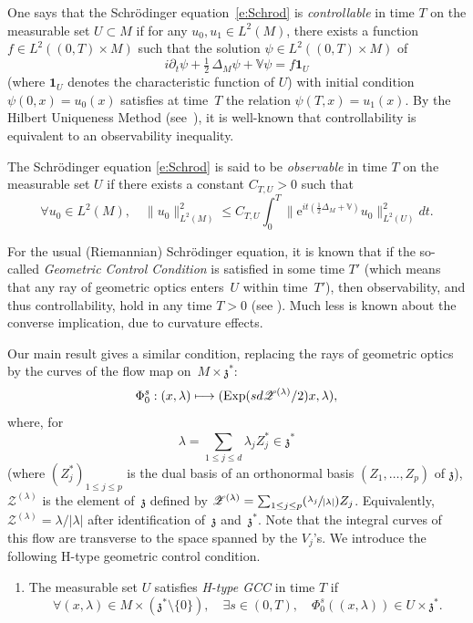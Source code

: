 \documentclass[10pt]{amsart}
\let\mathcal\mathscr
\newcommand\mto{\mathchoice{\longmapsto}{\mapsto}{\mapsto}{\mapsto}}
\newcommand{\Psfrac}[2]{(\sfrac{#1}{#2})}
\newcommand{\rme}{\mathrm{e}}
\newcommand{\bun}{\mathbf{1}}
\DeclareMathOperator{\Exp}{Exp}
\theoremstyle{plain}
\theoremstyle{definition}
\def\bbV{{\mathbb V}}
\begin{document}
One says that the Schrödinger equation~\eqref{e:Schrod} is \emph{controllable} in time $T$ on the measurable set $U\subset M$ if for any
$u_0,u_1\in L^2(M)$, there exists a function $f\in L^2((0,T)\times M)$ such that the solution $\psi\in L^2((0,T)\times M)$ of
\[
i\partial_t \psi+\tfrac 12\, \Delta_M \psi+\bbV\psi=f\bun_U
\]
(where $\bun_U$ denotes the characteristic function of $U$) with initial condition $\psi(0,x)=u_0(x)$ satisfies at time~$T$ the relation $\psi(T,x)=u_1(x).$
By the Hilbert Uniqueness Method (see~\cite{JLL}), it is well-known that controllability is equivalent to an observability inequality.

The Schrödinger equation \eqref{e:Schrod} is said to be \emph{observable} in time $T$ on the measurable set $U$ if there exists a constant $C_{T,U}>0$ such that
\begin{equation}\label{obs}
\forall u_0\in L^2(M),\quad \|u_0\|^2_{L^2(M)} \leq C_{T,U} \int_0^T \bigl\| \rme^{it(\frac12 \Delta_M+\bbV)} u_0\bigr\|^2_{L^2(U)} dt.
\end{equation}

For the usual (Riemannian) Schrödinger equation, it is known that if the so-called \emph{Geometric Control Condition} is satisfied in some time $T'$ (which means that any ray of geometric optics enters~$U$ within time~$T'$), then observability, and thus controllability, hold in any time $T>0$ (see \cite{Leb}). Much less is known about the converse implication, due to curvature effects.

Our main result
gives a similar condition, replacing the rays of geometric optics by the curves of the flow map on~$M\times \mathfrak z^*$:
\[
\Phi^s_0: (x,\lambda)\mto (\Exp (sd\mathcal Z^{(\lambda)}/2)x,\lambda),
\]
where, for
\[
\lambda= \sum_{1\leq j\leq d } \lambda_j Z_j^*\in\mathfrak z^*
\]
(where $(Z_j^*)_{1\leq j\leq p}$ is the dual basis of an ortho\-normal basis $(Z_1,\dots,Z_p)$ of $\mathfrak z$), $\mathcal Z^{(\lambda)}$ is the element of~$\mathfrak z$ defined by
$\mathcal Z^{(\lambda)} = \sum_{1\leq j\leq p} \Psfrac{\lambda_j}{|\lambda| }Z_j$. Equivalently, $\mathcal Z^{(\lambda)}= \lambda/|\lambda|$ after identification of~$\mathfrak z$ and~$\mathfrak z^*$.
Note that the integral curves of this flow are transverse to the space spanned by the $V_j$'s.
We introduce the following H-type geometric control condition.

\begin{enumerate}\renewcommand{\theenumi}{H-GCC}
\item\label{H-GCC}
The measurable set $U$ satisfies \emph{H-type GCC} in time $T$ if
\[
\forall (x,\lambda)\in M\times(\mathfrak z^*\setminus\{0\}),\quad \exists s\in (0,T),\quad \Phi^{s}_0 ((x,\lambda))\in U\times \mathfrak z^*.
\]
\end{enumerate}
\end{document}
